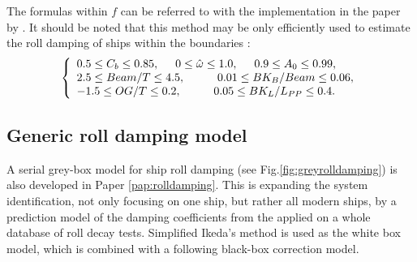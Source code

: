 \noindent The formulas within $f$ can be referred to \parencite{ikeda_velocity_1979, kawahara_simple_2011} with the implementation in the paper by \cite{alexandersson_martinlarsalbertrolldecay-estimators_2020}.
It should be noted that this method may be only efficiently used to estimate the roll damping of ships within the boundaries \parencite{kawahara_simple_2011}:
\begin{equation}
    \label{eq:SI_limits}
     \left\{
     \begin{array}{ll}
    0.5 \leq C_b \leq 0.85,\hspace{0.5cm} 
    0 \leq \hat{\omega} \leq 1.0,
    \hspace{0.5cm}
    0.9 \leq A_0 \leq 0.99,\\
    2.5\leq Beam/T \leq 4.5, \hspace{1cm}
    0.01 \leq BK_B/Beam \leq 0.06, \\
        -1.5 \leq OG/T \leq 0.2,
     \hspace{1cm}
    0.05 \leq BK_L/L_{PP} \leq 0.4.
    \end{array}
    \right.
\end{equation}

\subsection{Generic roll damping model}
\label{sec:genericrolldampingmodel}
A serial grey-box model for ship roll damping (see Fig.\ref{fig:greyrolldamping}) is also developed in Paper \ref{pap:rolldamping}. 
This is expanding the system identification, not only focusing on one ship, but rather all modern ships, by a prediction model of the damping coefficients from the  applied on a whole database of roll decay tests. 
Simplified Ikeda's method \cite{kawahara_simple_2011} is used as the white box model, which is combined with a following black-box correction model.


